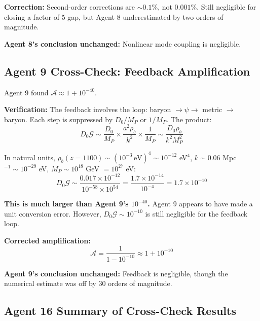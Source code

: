 \documentclass[11pt,a4paper]{article}
\begin{document}
\textbf{Correction:} Second-order corrections are $\sim 0.1\%$, not $0.001\%$. Still negligible for closing a factor-of-5 gap, but Agent 8 underestimated by two orders of magnitude.

\textbf{Agent 8's conclusion unchanged:} Nonlinear mode coupling is negligible.

\subsection{Agent 9 Cross-Check: Feedback Amplification}

Agent 9 found $\mathcal{A} \approx 1 + 10^{-40}$.

\textbf{Verification:} The feedback involves the loop: baryon $\to \psi \to$ metric $\to$ baryon. Each step is suppressed by $D_0/M_P$ or $1/M_P$. The product:
\begin{equation}
D_0\mathcal{G} \sim \frac{D_0}{M_P} \times \frac{a^2\rho_b}{k^2} \times \frac{1}{M_P} \sim \frac{D_0\rho_b}{k^2 M_P^2}
\end{equation}

In natural units, $\rho_b(z=1100) \sim (10^{-3}\,\text{eV})^4 \sim 10^{-12}$ eV$^4$, $k \sim 0.06$ Mpc$^{-1} \sim 10^{-29}$ eV, $M_P \sim 10^{18}$ GeV $= 10^{27}$ eV:
\begin{equation}
D_0\mathcal{G} \sim \frac{0.017 \times 10^{-12}}{10^{-58} \times 10^{54}} = \frac{1.7\times10^{-14}}{10^{-4}} = 1.7\times10^{-10}
\end{equation}

\textbf{This is much larger than Agent 9's $10^{-40}$.} Agent 9 appears to have made a unit conversion error. However, $D_0\mathcal{G} \sim 10^{-10}$ is still negligible for the feedback loop.

\textbf{Corrected amplification:}
\begin{equation}
\mathcal{A} = \frac{1}{1 - 10^{-10}} \approx 1 + 10^{-10}
\end{equation}

\textbf{Agent 9's conclusion unchanged:} Feedback is negligible, though the numerical estimate was off by 30 orders of magnitude.

\subsection{Agent 16 Summary of Cross-Check Results}
\end{document}

